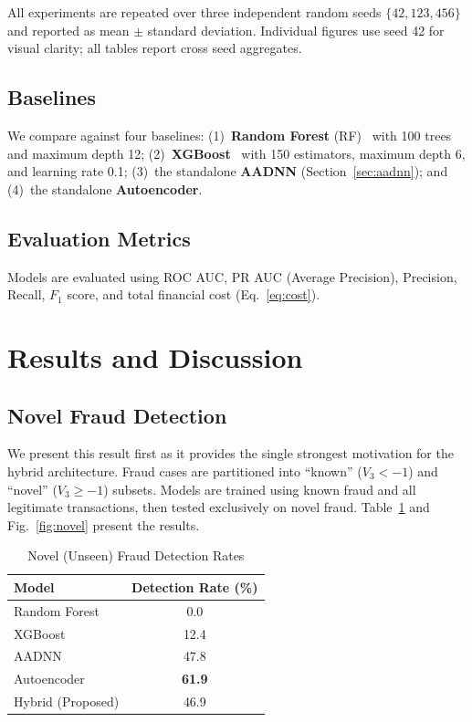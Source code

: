 \documentclass[conference]{IEEEtran}
\begin{document}
All experiments are repeated over three independent random seeds $\{42, 123, 456\}$ and reported as mean $\pm$ standard deviation. Individual figures use seed 42 for visual clarity; all tables report cross seed aggregates.

\subsection{Baselines}

We compare against four baselines: (1)~\textbf{Random Forest} (RF)~\cite{breiman2001random} with 100 trees and maximum depth 12; (2)~\textbf{XGBoost}~\cite{chen2016xgboost} with 150 estimators, maximum depth 6, and learning rate 0.1; (3)~the standalone \textbf{AADNN} (Section~\ref{sec:aadnn}); and (4)~the standalone \textbf{Autoencoder}.

\subsection{Evaluation Metrics}

Models are evaluated using ROC AUC, PR AUC (Average Precision), Precision, Recall, $F_1$ score, and total financial cost (Eq.~\ref{eq:cost}).

\section{Results and Discussion}
\label{sec:results}

\subsection{Novel Fraud Detection}

We present this result first as it provides the single strongest motivation for the hybrid architecture. Fraud cases are partitioned into ``known'' ($V_3 < -1$) and ``novel'' ($V_3 \geq -1$) subsets. Models are trained using known fraud and all legitimate transactions, then tested exclusively on novel fraud. Table~\ref{tab:novel} and Fig.~\ref{fig:novel} present the results.

\begin{table}[!t]
\centering
\caption{Novel (Unseen) Fraud Detection Rates}
\label{tab:novel}
\begin{tabular}{@{}lc@{}}
\toprule
\textbf{Model} & \textbf{Detection Rate (\%)} \\
\midrule
Random Forest  & 0.0 \\
XGBoost        & 12.4 \\
AADNN          & 47.8 \\
Autoencoder    & \textbf{61.9} \\
Hybrid (Proposed) & 46.9 \\
\bottomrule
\end{tabular}
\end{table}
\end{document}
